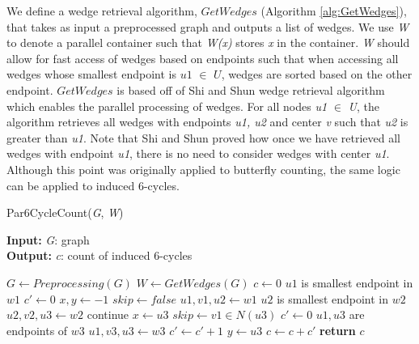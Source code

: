 \documentclass[11pt]{article}
\begin{document}
We define a wedge retrieval algorithm, $GetWedges$ (Algorithm \ref{alg:GetWedges}), that takes as input a preprocessed graph and outputs a list of wedges.
We use \textit{W} to denote a parallel container such that \textit{W(x)} stores \textit{x} in the container.
\textit{W} should allow for fast access of wedges based on endpoints such that when accessing all wedges whose smallest endpoint is $u1$ $\in$ $U$, wedges are sorted based on the other endpoint.
$GetWedges$ is based off of Shi and Shun \cite{shi2019parallel} wedge retrieval algorithm which enables the parallel processing of wedges.
For all nodes \textit{u1} $\in$ \textit{U}, the algorithm retrieves all wedges with endpoints \textit{u1, u2} and center \textit{v} such that \textit{u2} is greater than \textit{u1}.
Note that Shi and Shun proved how once we have retrieved all wedges with endpoint \textit{u1}, there is no need to consider wedges with center \textit{u1}.
Although this point was originally applied to butterfly counting, the same logic can be applied to induced 6-cycles.

\begin{algorithm}[H]
\caption{Par6CycleCount(\textit{G}, \textit{W})}
\label{alg:Par6CycleCount}
\hspace*{\algorithmicindent} \textbf{Input:} \textit{G}: graph\\
\hspace*{\algorithmicindent} \textbf{Output:} \textit{c}: count of induced 6-cycles
\begin{algorithmic}[1]
    \State $G \gets Preprocessing(G)$
    \State $W \gets GetWedges(G)$
    \State $c \gets 0$
         \Comment $u1$ is smallest endpoint in $w1$
            \State $c' \gets 0$
            \State $x, y \gets -1$
            \State $skip \gets false$
            \State $u1, v1, u2 \gets w1$
             \Comment $u2$ is smallest endpoint in $w2$
                \State $u2, v2, u3 \gets w2$
                    \State continue
                \EndIf
                \State $x \gets u3$
                \State $skip \gets v1 \in N(u3)$
                        \State $c' \gets 0$
                         \Comment $u1, u3$ are endpoints of $w3$
                            \State $u1, v3, u3 \gets w3$
                                \State $c' \gets c' + 1$
                            \EndIf
                        \EndFor
                        \State $y \gets u3$
                    \EndIf
                    \State $c \gets c + c'$
                \EndIf
            \EndFor
        \EndFor
    \EndFor
    \State \textbf{return} $c$
\end{algorithmic}
\end{algorithm}
\end{document}

